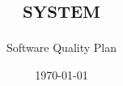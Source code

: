 \documentclass[Misc]{../../data/TelemacDoc}
\begin{document}
\let\cleardoublepage\clearpage

\title{\tel \mbox{\scshape{system}}}
\subtitle{Software Quality Plan}
\version{\telmaversion}
\date{\today}
\maketitle
\clearpage



\newpage

\thispagestyle{empty}

\TelemacCopyright{}




\pagestyle{empty} %

\tableofcontents%

\pagestyle{fancy} %


\end{document}
